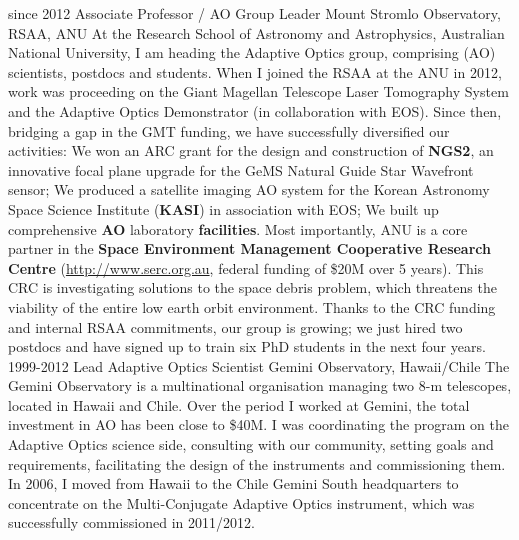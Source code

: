 \documentclass[]{friggeri-cv}
\begin{document}
\begin{entrylist}
  \entry
    {since 2012}
    {Associate Professor / AO Group Leader}
    {Mount Stromlo Observatory, RSAA, ANU}
    {At the Research School of Astronomy and Astrophysics, Australian National University, I am heading the Adaptive Optics group, comprising (AO) scientists, postdocs and students. When I joined the RSAA at the ANU in 2012, work was proceeding on the Giant Magellan Telescope Laser Tomography System and the Adaptive Optics Demonstrator (in collaboration with EOS). Since then, bridging a gap in the GMT funding, we have successfully diversified our activities: We won an ARC grant for the design and construction of \textbf{NGS2}, an innovative focal plane upgrade for the GeMS Natural Guide Star Wavefront sensor; We produced a satellite imaging AO system for the Korean Astronomy Space Science Institute (\textbf{KASI}) in association with EOS; We built up comprehensive \textbf{AO} laboratory \textbf{facilities}. Most importantly, ANU is a core partner in the \textbf{Space Environment Management Cooperative Research Centre} (\href{http://www.serc.org.au}{http://www.serc.org.au}, federal funding of \$20M over 5 years). This CRC is investigating solutions to the space debris problem, which threatens the viability of the entire low earth orbit environment. Thanks to the CRC funding and internal RSAA commitments, our group is growing; we just hired two postdocs and have signed up to train six PhD students in the next four years.}
  \entry
    {1999-2012}
    {Lead Adaptive Optics Scientist}
    {Gemini Observatory, Hawaii/Chile}
    {The Gemini Observatory is a multinational organisation managing two 8-m telescopes, located in Hawaii and Chile. Over the period I worked at Gemini, the total investment in AO has been close to \$40M. I was coordinating the program on the Adaptive Optics science side, consulting with our community, setting goals and requirements, facilitating the design of the instruments and commissioning them. In 2006, I moved from Hawaii to the Chile Gemini South headquarters to concentrate on the Multi-Conjugate Adaptive Optics instrument, which was successfully commissioned in 2011/2012.}

\end{entrylist}
\end{document}
